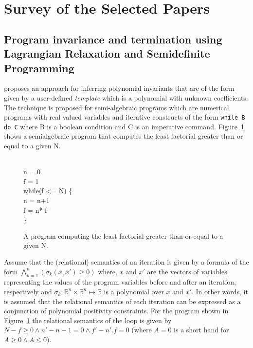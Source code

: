 \newcommand{\real}{\mathbb{R}}

\section{Survey of the Selected Papers}

\subsection{Program invariance and termination using Lagrangian Relaxation and Semidefinite Programming}

\cite{cousot:VMCAI05} proposes an approach for inferring polynomial invariants that 
are of the form given by a user-defined \emph{template} which is a polynomial with unknown coefficients.
The technique is proposed for semi-algebraic programs which are numerical programs with real valued variables 
and iterative constructs of the form \texttt{while B do C} where B is a boolean condition 
and C is an imperative command. Figure~\ref{fig:SAprogram} shows a semialgebraic program that computes the least factorial greater than or equal to a given N.
%
\begin{figure}
\begin{myprogram}
\\
\pnl \>  n = 0 \\
\pnl \> f = 1 \\
\pnl \> while(f <= N) \{ \\
\pnl \> \> n = n+1 \\
\pnl \> \> f = n* f \\
\pnl \> \}
\end{myprogram}
\caption{A program computing the least factorial greater than or equal to a given N.} \label{fig:SAprogram}
\end{figure}
%
Assume that the (relational) semantics of an iteration is given by a formula of the form
$\bigwedge \limits_{k=1}^{n} (\sigma_k(x,x') \ge 0)$ where, $x$ and $x'$ are the vectors of
variables representing the values of the program variables before and after an iteration, respectively 
and $\sigma_k : \real^n \times \real^n \mapsto \real$ is a polynomial over $x$ and $x'$. 
In other words, it is assumed that the relational semantics of each
iteration can be expressed as a conjunction of polynomial positivity constraints.
For the program shown in Figure~\ref{fig:SAprogram} the relational semantics of the 
loop is given by $N-f \ge 0 \wedge n' -n -1 = 0 \wedge f' - n'.f = 0$ (where 
$A = 0$ is a short hand for $A \ge 0 \wedge A \le 0$).

